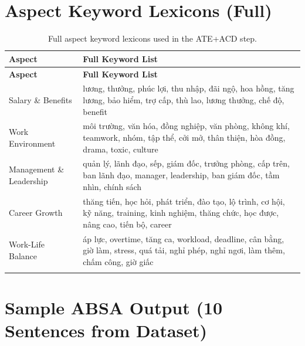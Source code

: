 \documentclass[12pt, a4paper]{article}
\begin{document}
\section{Aspect Keyword Lexicons (Full)}

\begin{longtable}{p{3.8cm} p{10cm}}
\toprule
\textbf{Aspect} & \textbf{Full Keyword List} \\
\midrule
\endfirsthead
\toprule
\textbf{Aspect} & \textbf{Full Keyword List} \\
\midrule
\endhead
Salary \& Benefits & lương, thưởng, phúc lợi, thu nhập, đãi ngộ, hoa hồng, tăng lương, bảo hiểm, trợ cấp, thù lao, lương thưởng, chế độ, benefit \\
\addlinespace
Work Environment & môi trường, văn hóa, đồng nghiệp, văn phòng, không khí, teamwork, nhóm, tập thể, cởi mở, thân thiện, hòa đồng, drama, toxic, culture \\
\addlinespace
Management \& Leadership & quản lý, lãnh đạo, sếp, giám đốc, trưởng phòng, cấp trên, ban lãnh đạo, manager, leadership, ban giám đốc, tầm nhìn, chính sách \\
\addlinespace
Career Growth & thăng tiến, học hỏi, phát triển, đào tạo, lộ trình, cơ hội, kỹ năng, training, kinh nghiệm, thăng chức, học được, nâng cao, tiến bộ, career \\
\addlinespace
Work-Life Balance & áp lực, overtime, tăng ca, workload, deadline, cân bằng, giờ làm, stress, quá tải, nghỉ phép, nghỉ ngơi, làm thêm, chấm công, giờ giấc \\
\bottomrule
\caption{Full aspect keyword lexicons used in the ATE+ACD step.}
\end{longtable}

\section{Sample ABSA Output (10 Sentences from Dataset)}
\end{document}
